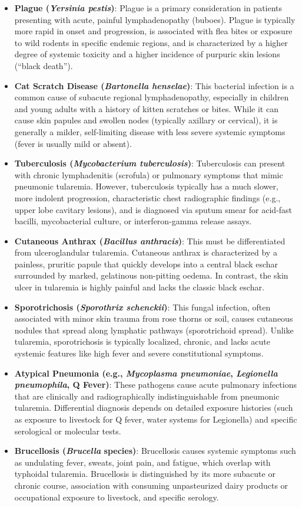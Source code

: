 \begin{itemize}
    \item \textbf{Plague (\textit{Yersinia pestis})}: Plague is a primary consideration in patients presenting with acute, painful lymphadenopathy (buboes). Plague is typically more rapid in onset and progression, is associated with flea bites or exposure to wild rodents in specific endemic regions, and is characterized by a higher degree of systemic toxicity and a higher incidence of purpuric skin lesions (``black death'').
    \item \textbf{Cat Scratch Disease (\textit{Bartonella henselae})}: This bacterial infection is a common cause of subacute regional lymphadenopathy, especially in children and young adults with a history of kitten scratches or bites. While it can cause skin papules and swollen nodes (typically axillary or cervical), it is generally a milder, self-limiting disease with less severe systemic symptoms (fever is usually mild or absent).
    \item \textbf{Tuberculosis (\textit{Mycobacterium tuberculosis})}: Tuberculosis can present with chronic lymphadenitis (scrofula) or pulmonary symptoms that mimic pneumonic tularemia. However, tuberculosis typically has a much slower, more indolent progression, characteristic chest radiographic findings (e.g., upper lobe cavitary lesions), and is diagnosed via sputum smear for acid-fast bacilli, mycobacterial culture, or interferon-gamma release assays.
    \item \textbf{Cutaneous Anthrax (\textit{Bacillus anthracis})}: This must be differentiated from ulceroglandular tularemia. Cutaneous anthrax is characterized by a painless, pruritic papule that quickly develops into a central black eschar surrounded by marked, gelatinous non-pitting oedema. In contrast, the skin ulcer in tularemia is highly painful and lacks the classic black eschar.
    \item \textbf{Sporotrichosis (\textit{Sporothrix schenckii})}: This fungal infection, often associated with minor skin trauma from rose thorns or soil, causes cutaneous nodules that spread along lymphatic pathways (sporotrichoid spread). Unlike tularemia, sporotrichosis is typically localized, chronic, and lacks acute systemic features like high fever and severe constitutional symptoms.
    \item \textbf{Atypical Pneumonia (e.g., \textit{Mycoplasma pneumoniae}, \textit{Legionella pneumophila}, Q Fever)}: These pathogens cause acute pulmonary infections that are clinically and radiographically indistinguishable from pneumonic tularemia. Differential diagnosis depends on detailed exposure histories (such as exposure to livestock for Q fever, water systems for Legionella) and specific serological or molecular tests.
    \item \textbf{Brucellosis (\textit{Brucella} species)}: Brucellosis causes systemic symptoms such as undulating fever, sweats, joint pain, and fatigue, which overlap with typhoidal tularemia. Brucellosis is distinguished by its more subacute or chronic course, association with consuming unpasteurized dairy products or occupational exposure to livestock, and specific serology.
\end{itemize}

